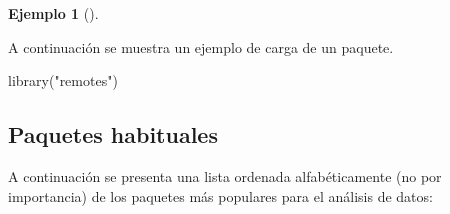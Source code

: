 \documentclass[
  a4paper,
]{scrreport}
\newenvironment{Shaded}{\begin{snugshade}}{\end{snugshade}}
\newcommand{\FunctionTok}[1]{\textcolor[rgb]{0.28,0.35,0.67}{#1}}
\newcommand{\NormalTok}[1]{\textcolor[rgb]{0.00,0.23,0.31}{#1}}
\newcommand{\StringTok}[1]{\textcolor[rgb]{0.13,0.47,0.30}{#1}}
\theoremstyle{definition}
\theoremstyle{definition}
\newtheorem{example}{Ejemplo}[chapter]
\theoremstyle{remark}
\begin{document}
\leavevmode{}%
\begin{example}[]\label{exm-carga-paquetes}

A continuación se muestra un ejemplo de carga de un paquete.

\begin{Shaded}
\begin{Highlighting}[]
\FunctionTok{library}\NormalTok{(}\StringTok{"remotes"}\NormalTok{)}
\end{Highlighting}
\end{Shaded}

\end{example}

\hypertarget{paquetes-habituales}{%
\subsection{Paquetes habituales}\label{paquetes-habituales}}

A continuación se presenta una lista ordenada alfabéticamente (no por
importancia) de los paquetes más populares para el análisis de datos:
\end{document}
